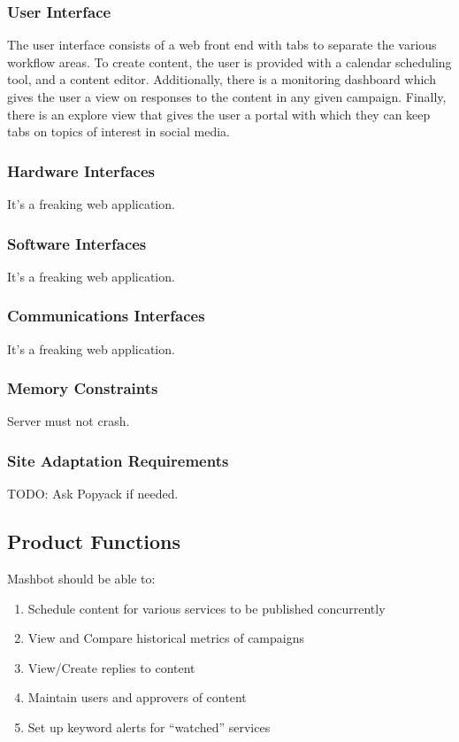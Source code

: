 \documentclass{article}
\begin{document}
		\subsubsection{User Interface} %
                The user interface consists of a web front end
                with tabs to separate the various workflow areas. To
                create content, the user is provided with a calendar
                scheduling tool, and a content editor.  Additionally,
                there is a monitoring dashboard which gives the user a
                view on responses to the content in any given campaign.
                Finally, there is an explore view that gives the user a
                portal with which they can keep tabs on topics of 
                interest in social media.
		\subsubsection{Hardware Interfaces} %
                It's a freaking web application.
		\subsubsection{Software Interfaces} %
                It's a freaking web application.
		\subsubsection{Communications Interfaces} %
                It's a freaking web application.
		\subsubsection{Memory Constraints} %
                Server must not crash.
		\subsubsection{Site Adaptation Requirements} %
                TODO: Ask Popyack if needed.
	\subsection{Product Functions} %
        Mashbot should be able to:
        \begin{enumerate}
          \item Schedule content for various services to be
            published concurrently
          \item View and Compare historical metrics of campaigns
          \item View/Create replies to content
          \item Maintain users and approvers of content
          \item Set up keyword alerts for ``watched'' services
        \end{enumerate}
\end{document}
